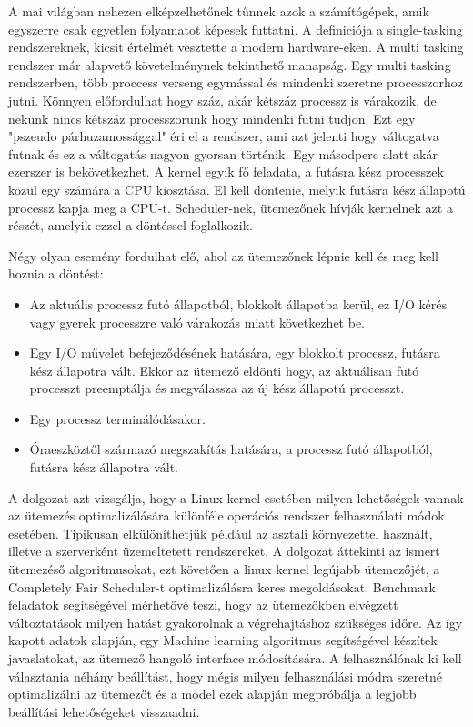 
A mai világban nehezen elképzelhetőnek tűnnek azok a számítógépek, amik egyszerre csak egyetlen folyamatot képesek futtatni.
A definiciója a single-tasking rendszereknek, kicsit értelmét vesztette a modern hardware-eken. A multi tasking rendszer már alapvető követelménynek tekinthető manapság. Egy multi tasking rendszerben, több proccess verseng egymással és mindenki szeretne processzorhoz jutni. Könnyen előfordulhat hogy száz, akár kétszáz processz is várakozik, de nekünk nincs  kétszáz processzorunk hogy mindenki futni tudjon. Ezt egy "pszeudo párhuzamossággal" éri el a rendszer, ami azt jelenti hogy váltogatva futnak és ez a váltogatás nagyon gyorsan történik. Egy másodperc alatt akár ezerszer is bekövetkezhet.
A kernel egyik fő feladata, a futásra kész processzek közül egy számára a CPU  kiosztása. El kell döntenie, melyik futásra kész állapotú processz kapja meg a CPU-t. Scheduler-nek, ütemezőnek hívják kernelnek azt a részét, amelyik ezzel a döntéssel foglalkozik.

Négy olyan esemény fordulhat elő, ahol az ütemezőnek lépnie kell és meg kell hoznia a döntést:
\begin{itemize}
  \item Az aktuális processz futó állapotból, blokkolt állapotba kerül, ez I/O kérés vagy gyerek processzre való várakozás miatt következhet be.
  \item Egy I/O művelet befejeződésének hatására, egy blokkolt processz, futásra kész állapotra vált. Ekkor az ütemező eldönti hogy, az aktuálisan futó processzt preemptálja és megválassza az új kész állapotú processzt.
  \item Egy processz terminálódásakor.
  \item Óraeszköztől származó megszakítás hatására, a processz futó állapotból, futásra kész állapotra vált. 
\end{itemize}

A dolgozat azt vizsgálja, hogy a Linux kernel esetében milyen lehetőségek vannak az ütemezés optimalizálására különféle operációs rendszer felhasználati módok esetében. Tipikusan elkülöníthetjük például az asztali környezettel használt, illetve a szerverként üzemeltetett rendszereket. A dolgozat áttekinti az ismert ütemezéső algoritmusokat, ezt követően a linux kernel legújabb ütemezőjét, a Completely Fair Scheduler-t optimalizálásra keres megoldásokat. Benchmark feladatok segítségével mérhetővé teszi, hogy az ütemezőkben elvégzett változtatások milyen hatást gyakorolnak a végrehajtáshoz szükséges időre.
Az így kapott adatok alapján, egy Machine learning algoritmus segítségével készítek javaslatokat, az ütemező hangoló interface módosítására. A felhasználónak ki kell választania néhány beállítást, hogy mégis milyen felhasználási módra szeretné optimalizálni az ütemezőt és a model ezek alapján megpróbálja a legjobb beállítási lehetőségeket visszaadni.
